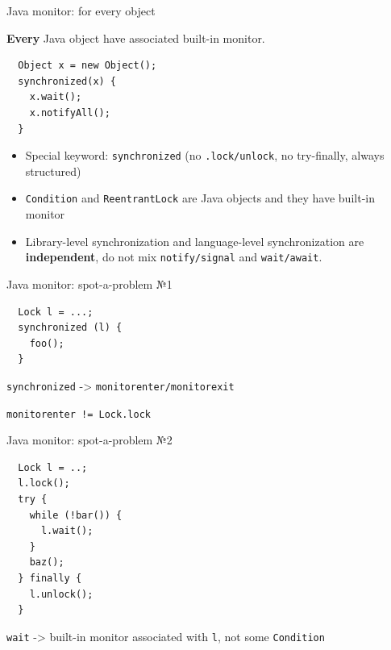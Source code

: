 \begin{frame}[fragile]{Java monitor: for every object}

\textbf{Every} Java object have associated built-in monitor.

\begin{verbatim}
  Object x = new Object();
  synchronized(x) {
    x.wait();
    x.notifyAll();
  }
\end{verbatim}

\begin{itemize}
    \item Special keyword: \texttt{synchronized} (no \texttt{.lock/unlock}, no try-finally, always structured)
    \item \texttt{Condition} and \texttt{ReentrantLock} are Java objects and they have built-in monitor
    \item Library-level synchronization and language-level synchronization are \textbf{independent}, do not mix \texttt{notify/signal} and \texttt{wait/await}.
\end{itemize}

\end{frame}

\begin{frame}[t,fragile]{Java monitor: spot-a-problem №1}

\begin{verbatim}
  Lock l = ...;
  synchronized (l) {
    foo();
  }
\end{verbatim}

\pause 

\texttt{synchronized} -> \texttt{monitorenter/monitorexit} 

\pause

\texttt{monitorenter != Lock.lock}

\end{frame}

\begin{frame}[t,fragile]{Java monitor: spot-a-problem №2}

\begin{verbatim}
  Lock l = ..;
  l.lock();
  try {
    while (!bar()) { 
      l.wait(); 
    }
    baz();
  } finally { 
    l.unlock(); 
  }
\end{verbatim}

\pause 

\texttt{wait} -> built-in monitor associated with \texttt{l}, not some \texttt{Condition}

\end{frame}

